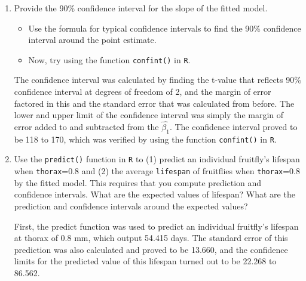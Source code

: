 \documentclass[12pt,letterpaper]{article}
\begin{document}
\begin{enumerate}
	\vspace{1cm}
	
	\item
	
	Provide the 90\% confidence interval for the slope of the fitted model.
	
			\vspace{.5cm}
	\begin{itemize}
		\item
		Use the formula for typical confidence intervals to find the 90\% confidence interval around the point estimate.		\vspace{.5cm}
		\item
		Now, try using the function  \texttt{confint()}  in \texttt{R}.
	\end{itemize}
	
	\vspace{.5cm}
	
	The confidence interval was calculated by finding the t-value that reflects 90\% confidence interval at degrees of freedom of 2, and the margin of error factored in this and the standard error that was calculated from before. The lower and upper limit of the confidence interval was simply the margin of error added to and subtracted from the $\hat{\beta_1}$. The confidence interval proved to be 118 to 170, which was verified by using the function  \texttt{confint()}  in \texttt{R}.
	
	

	\vspace{.5cm}
			
	\item Use the \texttt{predict()} function in \texttt{R} to (1) predict an individual fruitfly's lifespan when \texttt{thorax}=0.8 and (2) the average \texttt{lifespan} of fruitflies when \texttt{thorax}=0.8 by the fitted model. This requires that you compute prediction and confidence intervals. What are the expected values of lifespan? What are the prediction and confidence intervals around the expected values? 
	
	\vspace{.5cm}
	
	First, the predict function was used to predict an individual fruitfly's lifespan at thorax of 0.8 mm, which output 54.415 days. The standard error of this prediction was also calculated and proved to be 13.660, and the confidence limits for the predicted value of this lifespan turned out to be 22.268 to 86.562.
	

\end{enumerate}
\end{document}
